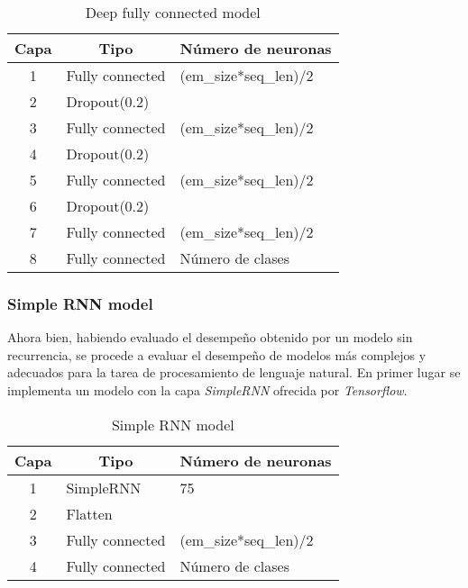 \begin{table}[H]
\centering
\caption{Deep fully connected model}
\label{tab:deepFC_1}
\begin{tabular}{|c|l|l|}
\hline
\textbf{Capa} & \multicolumn{1}{c|}{\textbf{Tipo}} & \multicolumn{1}{c|}{\textbf{Número de neuronas}} \\ \hline
1             & Fully connected                    & (em\_size*seq\_len)/2                            \\ \hline
2             & Dropout(0.2)                       &                                                  \\ \hline
3             & Fully connected                    & (em\_size*seq\_len)/2                            \\ \hline
4             & Dropout(0.2)                       &                                                  \\ \hline
5             & Fully connected                    & (em\_size*seq\_len)/2                            \\ \hline
6             & Dropout(0.2)                       &                                                  \\ \hline
7             & Fully connected                    & (em\_size*seq\_len)/2                            \\ \hline
8             & Fully connected                    & Número de clases                                 \\ \hline
\end{tabular}
\end{table}

\subsubsection{Simple RNN model}
Ahora bien, habiendo evaluado el desempeño obtenido por un modelo sin recurrencia, se procede a evaluar el desempeño de modelos más complejos y adecuados para la tarea de procesamiento de lenguaje natural. En primer lugar se implementa un modelo con la capa \textit{SimpleRNN} ofrecida por \textit{Tensorflow}.

\begin{table}[H]
\centering
\caption{Simple RNN model}
\label{tab:simpleRNN_1}
\begin{tabular}{|c|l|l|}
\hline
\textbf{Capa} & \multicolumn{1}{c|}{\textbf{Tipo}} & \multicolumn{1}{c|}{\textbf{Número de neuronas}} \\ \hline
1             & SimpleRNN                          & 75                                               \\ \hline
2             & Flatten                            &                                                  \\ \hline
3             & Fully connected                    & (em\_size*seq\_len)/2                            \\ \hline
4             & Fully connected                    & Número de clases                                 \\ \hline
\end{tabular}
\end{table}

